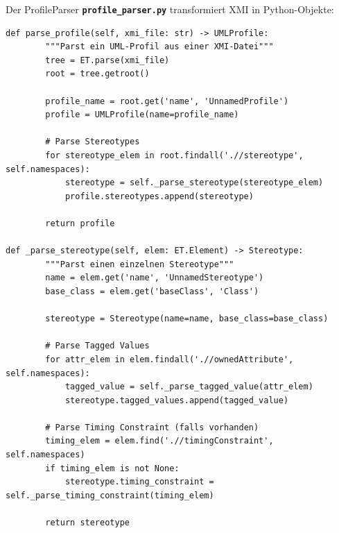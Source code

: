 ﻿\documentclass[a4paper,12pt]{scrreprt}
\theoremstyle{definition}
\begin{document}
Der ProfileParser  \texttt{\textbf{profile\_parser.py}} transformiert XMI in Python-Objekte:
\begin{lstlisting}[style=python, caption={ProfileParser Implementierung}, label={lst:profile-parser}]
def parse_profile(self, xmi_file: str) -> UMLProfile:
        """Parst ein UML-Profil aus einer XMI-Datei"""
        tree = ET.parse(xmi_file)
        root = tree.getroot()
        
        profile_name = root.get('name', 'UnnamedProfile')
        profile = UMLProfile(name=profile_name)
        
        # Parse Stereotypes
        for stereotype_elem in root.findall('.//stereotype', self.namespaces):
            stereotype = self._parse_stereotype(stereotype_elem)
            profile.stereotypes.append(stereotype)
        
        return profile
    
def _parse_stereotype(self, elem: ET.Element) -> Stereotype:
        """Parst einen einzelnen Stereotype"""
        name = elem.get('name', 'UnnamedStereotype')
        base_class = elem.get('baseClass', 'Class')
        
        stereotype = Stereotype(name=name, base_class=base_class)
        
        # Parse Tagged Values
        for attr_elem in elem.findall('.//ownedAttribute', self.namespaces):
            tagged_value = self._parse_tagged_value(attr_elem)
            stereotype.tagged_values.append(tagged_value)
        
        # Parse Timing Constraint (falls vorhanden)
        timing_elem = elem.find('.//timingConstraint', self.namespaces)
        if timing_elem is not None:
            stereotype.timing_constraint = self._parse_timing_constraint(timing_elem)
        
        return stereotype
\end{lstlisting}
\end{document}
